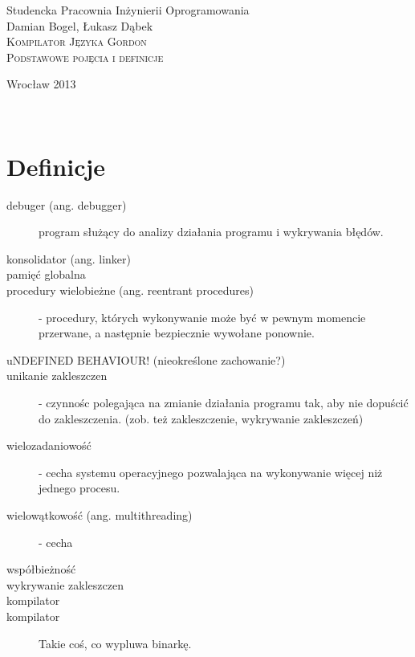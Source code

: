 \documentclass[12pt]{article}
\begin{document}
\begin{titlepage}
\begin{center}
Studencka Pracownia Inżynierii Oprogramowania\\[3.5cm]

Damian Bogel, Łukasz Dąbek\\[1cm]
\textsc{\LARGE Kompilator Języka Gordon}\\[1cm]
\textsc{\large Podstawowe pojęcia i definicje}

\vfill
Wrocław 2013

\end{center}
\end{titlepage}

\newpage
~
\newpage

\section{Definicje}
\begin{description}
	\item[debuger (ang. debugger)] program służący do analizy działania programu i wykrywania błędów.
	\item[konsolidator (ang. linker)] 
	\item[pamięć globalna]
	\item[procedury wielobieżne (ang. reentrant procedures)] - procedury, których wykonywanie może być w pewnym momencie przerwane, a następnie bezpiecznie wywołane ponownie.
	\item[uNDEFINED BEHAVIOUR! (nieokreślone zachowanie?)]
	\item[unikanie zakleszczen] - czynnośc polegająca na zmianie działania programu tak, aby nie dopuścić do zakleszczenia. (zob. też zakleszczenie, wykrywanie zakleszczeń)
	\item[wielozadaniowość] - cecha systemu operacyjnego pozwalająca na wykonywanie więcej niż jednego procesu.
	\item[wielowątkowość (ang. multithreading)] - cecha
	\item[współbieżność]
	\item[wykrywanie zakleszczen]
	\item[kompilator]
    \item[kompilator] Takie coś, co wypluwa binarkę.
\end{description}
\end{document}
